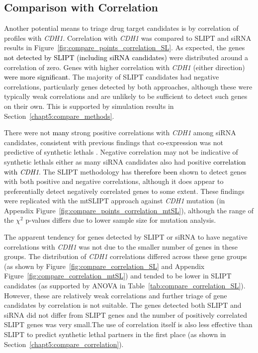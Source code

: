\subsection{Comparison with Correlation} \label{chapt3:compare_correlation} 

Another potential means to triage drug target candidates is by correlation of  profiles with \textit{CDH1}. Correlation with \textit{CDH1} was compared to \gls{SLIPT} and \gls{siRNA} results in Figure~\ref{fig:compare_points_correlation_SL}. As expected, the genes \textcolor{black}{not detected by \gls{SLIPT} (including \gls{siRNA} candidates)} were distributed around a correlation of zero. Genes with higher correlation with \textit{CDH1} (either direction) \textcolor{black}{were more significant.} The majority of \gls{SLIPT} candidates had negative correlations, particularly genes detected by both approaches, although these were typically weak correlations and are unlikely to be sufficient to detect such genes on their own. This is supported by simulation results in Section~\ref{chapt5:compare_methods}.



There were not \textcolor{black}{many} strong positive correlations with \textit{CDH1} among \gls{siRNA} candidates, consistent with previous findings that co-expression was not predictive of \glspl{synthetic lethal} \citep{Jerby2014, Lu2015}. Negative correlation may not be indicative of \glspl{synthetic lethal} either as many \gls{siRNA} candidates also had positive \textcolor{black}{correlation with \textit{CDH1}}. The \gls{SLIPT} methodology has \textcolor{black}{therefore been} shown to detect genes with both positive and negative correlations, although it does appear to preferentially detect negatively correlated genes to some extent. These findings were replicated with the \acrshort{mtSLIPT} approach against \textit{CDH1} \gls{mutation} (in Appendix Figure~\ref{fig:compare_points_correlation_mtSL}), although the range of the $\chi^2$ p-values differs due to lower sample size for \gls{mutation} analysis.

\FloatBarrier

The apparent tendency for genes detected by \gls{SLIPT} or \gls{siRNA} to have negative correlations with \textit{CDH1}  was not due to the smaller number of genes in these groups. The distribution of \textit{CDH1} correlations differed across these gene groups (as shown by Figure~\ref{fig:compare_correlation_SL} and Appendix Figure~\ref{fig:compare_correlation_mtSL}) and tended to be lower in \gls{SLIPT} candidates (as supported by \gls{ANOVA} in Table~\ref{tab:compare_correlation_SL}). However, these are relatively weak correlations and further triage of gene candidates by correlation is not suitable. The genes detected both \gls{SLIPT} and \gls{siRNA} did not differ from \gls{SLIPT} genes and the number of positively correlated \gls{SLIPT} genes was very small.The use of correlation itself is also less effective than \gls{SLIPT} to predict \gls{synthetic lethal} partners in the first place (as shown in Section~\ref{chapt5:compare_correlation}).

